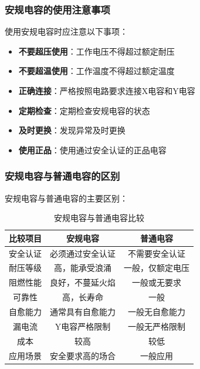 \documentclass[12pt,UTF8]{ctexbook}
\begin{document}
\subsubsection{安规电容的使用注意事项}

使用安规电容时应注意以下事项：

\begin{itemize}[leftmargin=2cm]
    \item \textbf{不要超压使用}：工作电压不得超过额定耐压
    \item \textbf{不要超温使用}：工作温度不得超过额定温度
    \item \textbf{正确连接}：严格按照电路要求连接X电容和Y电容
    \item \textbf{定期检查}：定期检查安规电容的状态
    \item \textbf{及时更换}：发现异常及时更换
    \item \textbf{使用正品}：使用通过安全认证的正品电容
\end{itemize}

\subsubsection{安规电容与普通电容的区别}

安规电容与普通电容的主要区别：

\begin{table}[H]
    \centering
    \begin{tabular}{|c|c|c|}
        \hline
        \textbf{比较项目} & \textbf{安规电容} & \textbf{普通电容} \\
        \hline
        安全认证 & 必须通过安全认证 & 不需要安全认证 \\
        \hline
        耐压等级 & 高，能承受浪涌 & 一般，仅额定电压 \\
        \hline
        阻燃性能 & 良好，不蔓延火焰 & 一般或无要求 \\
        \hline
        可靠性 & 高，长寿命 & 一般 \\
        \hline
        自愈能力 & 通常具有自愈能力 & 一般无自愈能力 \\
        \hline
        漏电流 & Y电容严格限制 & 一般无严格限制 \\
        \hline
        成本 & 较高 & 较低 \\
        \hline
        应用场景 & 安全要求高的场合 & 一般应用 \\
        \hline
    \end{tabular}
    \caption{安规电容与普通电容比较}
    \label{tab:safety_vs_normal_cap}
\end{table}
\end{document}
